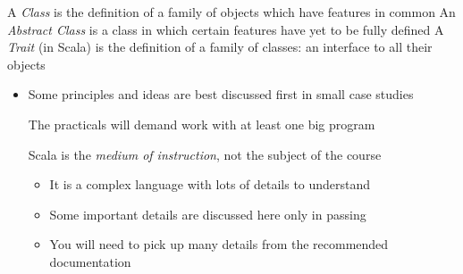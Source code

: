 \documentclass{ip3}
\begin{document}
\begin{foil}
\begin{itemize}
\vitem A \textit{Class} is the definition of a family of objects which have features in common
\vitem An \textit{Abstract Class} is a class in which certain features have yet to be fully defined
\vitem A \textit{Trait} (in Scala) is the definition of a family of classes: an interface to all their objects
\end{itemize}
\end{foil}

\begin{foil}[Caveat]
\begin{itemize}


\item Some principles and ideas are best discussed first in small case studies

\vitem The practicals will demand work with at least one big program

\vitem Scala is the \textit{medium of instruction}, not the subject of the course
\begin{itemize}
\item It is a complex language with lots of details to understand
\item Some important details are discussed here only in passing
\item You will need to pick up many details from the recommended documentation
\end{itemize}
\end{itemize}
\end{foil}



        
\end{document}
